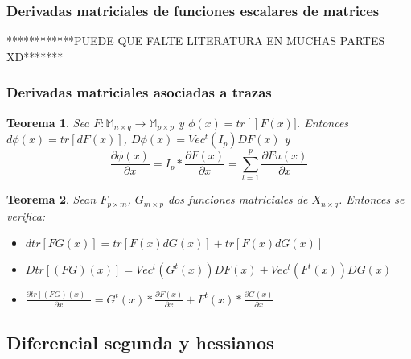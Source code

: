 \documentclass{article}
\theoremstyle{theorem-style}  %
\newtheorem{theorem}{Teorema}[section]  %
\theoremstyle{definition}
\theoremstyle{example-style}
\begin{document}
\subsubsection{Derivadas matriciales de funciones escalares de matrices}


************PUEDE QUE FALTE LITERATURA EN MUCHAS PARTES XD*******

\subsubsection*{Derivadas matriciales asociadas a trazas}

\begin{theorem}
	Sea $F:\mathbb{M}_{n\times q}\rightarrow \mathbb{M}_{p\times p}$ y $\phi (x) = tr[]F(x)]$. Entonces $d\phi(x)= tr[dF(x)]$, $D\phi(x)= Vec^t(I_p)DF(x)$ y 
	$$ \frac{\partial \phi(x)}{\partial x} = I_p* \frac{\partial F(x)}{\partial x} = \sum_{l=1}^{p} \frac{\partial Fu(x)}{\partial x} $$ 
\end{theorem}

\begin{theorem}
	Sean $F_{p\times m}$, $G_{m\times p}$ dos funciones matriciales de $X_{n\times q}$. Entonces se verifica:
	\begin{itemize}
		\item $dtr[FG(x)] = tr[F(x)dG(x)]+ tr[F(x)dG(x)]$
		\item $Dtr[(FG)(x)] = Vec^t(G^t(x))DF(x) + Vec^t(F^t(x))DG(x)$
		\item $ \frac{\partial tr[(FG)(x)]}{\partial x} = G^t(x) * \frac{\partial F(x)}{\partial x} + F^t(x) * \frac{\partial G(x)}{\partial x}$
	\end{itemize}
\end{theorem}



\subsection{Diferencial segunda y hessianos}


	
\end{document}
